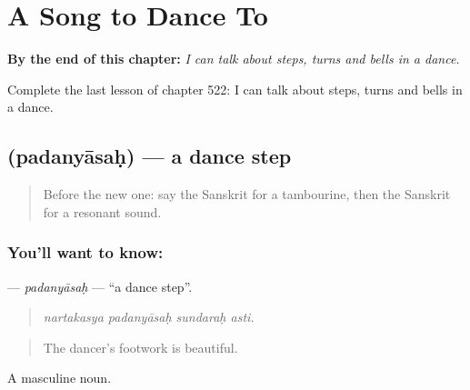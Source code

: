 
\chapter{A Song to Dance To}
\label{ch:sa-a-song-to-dance-to}

\begin{chapteropening}
\textbf{By the end of this chapter:} \emph{I can talk about steps, turns and bells in a dance.}

Complete the last lesson of chapter 522: I can talk about steps, turns and bells in a dance.
\end{chapteropening}

\section[\texorpdfstring{\sk{पदन्यासः} (padanyāsaḥ)}{पदन्यासः (padanyāsaḥ)}]{ (padanyāsaḥ) — a dance step}

\label{lesson:SA-C522-padanyasah}



\begin{quote}
Before the new one: say the Sanskrit for a tambourine, then the Sanskrit for a resonant sound.
\end{quote}

\subsection*{You'll want to know: }
\textbf{} — \emph{padanyāsaḥ} — \textquotedblleft{}a dance step\textquotedblright{}.

\begin{quote}
   
\end{quote}

\begin{quote}
\emph{nartakasya padanyāsaḥ sundaraḥ asti.}
\end{quote}

\begin{quote}
The dancer's footwork is beautiful.
\end{quote}

A masculine noun.

